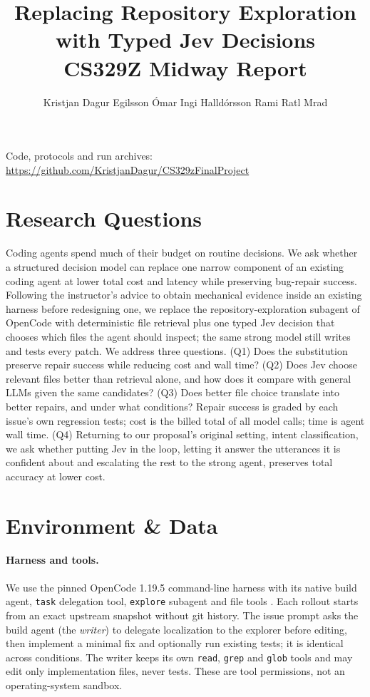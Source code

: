 \documentclass{article}
\title{Replacing Repository Exploration with Typed Jev Decisions\\CS329Z Midway Report}
\author{Kristjan Dagur Egilsson \And \'Omar Ingi Halld\'orsson \And Rami Ratl Mrad}
\begin{document}
\maketitle
{}
\vspace{-1.5em}
\begin{center}\small Code, protocols and run archives: \url{https://github.com/KristjanDagur/CS329zFinalProject}\end{center}

\section{Research Questions}

Coding agents spend much of their budget on routine decisions. We ask whether a structured decision model can replace one narrow component of an existing coding agent at lower total cost and latency while preserving bug-repair success. Following the instructor's advice to obtain mechanical evidence inside an existing harness before redesigning one, we replace the repository-exploration subagent of OpenCode with deterministic file retrieval plus one typed Jev decision that chooses which files the agent should inspect; the same strong model still writes and tests every patch. We address three questions. (Q1) Does the substitution preserve repair success while reducing cost and wall time? (Q2) Does Jev choose relevant files better than retrieval alone, and how does it compare with general LLMs given the same candidates? (Q3) Does better file choice translate into better repairs, and under what conditions? Repair success is graded by each issue's own regression tests; cost is the billed total of all model calls; time is agent wall time. (Q4) Returning to our proposal's original setting, intent classification, we ask whether putting Jev in the loop, letting it answer the utterances it is confident about and escalating the rest to the strong agent, preserves total accuracy at lower cost.

\section{Environment \& Data}

\paragraph{Harness and tools.}
We use the pinned OpenCode 1.19.5 command-line harness with its native build agent, \texttt{task} delegation tool, \texttt{explore} subagent and file tools \citep{opencode}. Each rollout starts from an exact upstream snapshot without git history. The issue prompt asks the build agent (the \emph{writer}) to delegate localization to the explorer before editing, then implement a minimal fix and optionally run existing tests; it is identical across conditions. The writer keeps its own \texttt{read}, \texttt{grep} and \texttt{glob} tools and may edit only implementation files, never tests. These are tool permissions, not an operating-system sandbox.
\end{document}
